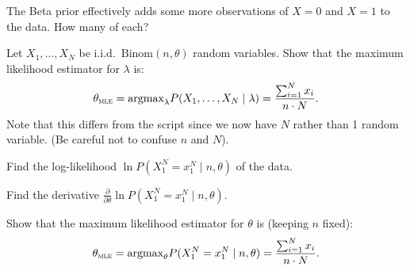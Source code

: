 \documentclass[a4paper,10pt,landscape,twocolumn]{scrartcl}
\begin{document}
\begin{exercise}
	\begin{subex}
		The Beta prior effectively adds some more observations of $X=0$ and $X=1$ to the data. How many of each? 
	\end{subex}


\begin{exercise}
	Let $X_1, \dots, X_N$ be i.i.d.\ $\text{Binom}(n, \theta)$ random variables. 
	Show that the maximum likelihood estimator for $\lambda$ is:
	\[
		\theta_\textsc{mle} = \text{argmax}_\lambda P(X_1, \dots, X_N \mid \lambda) = \frac{\sum_{i=1}^N x_i}{n \cdot N}.
	\] 
	Note that this differs from the script since we now have $N$ rather than 1 random variable. 
	(Be careful not to confuse $n$ and $N$).
	
	\begin{subex}
	Find the log-likelihood $\ln P(X_1^N=x_1^N \mid n, \theta)$ of the data.
	\end{subex}
	
	\begin{subex}
		Find the derivative $\frac{\partial}{\partial \theta} \ln P(X_1^N=x_1^N \mid n, \theta)$.
	\end{subex}
	
	\begin{subex}
		Show that the maximum likelihood estimator for $\theta$ is (keeping $n$ fixed):
		\[
			\theta_\textsc{mle} = \text{argmax}_\theta P(X_1^N=x_1^N \mid n, \theta) = \frac{\sum_{i=1}^N x_i}{n \cdot N}.
		\] 
	\end{subex}
	
\end{exercise}



\end{exercise}
\end{document}
